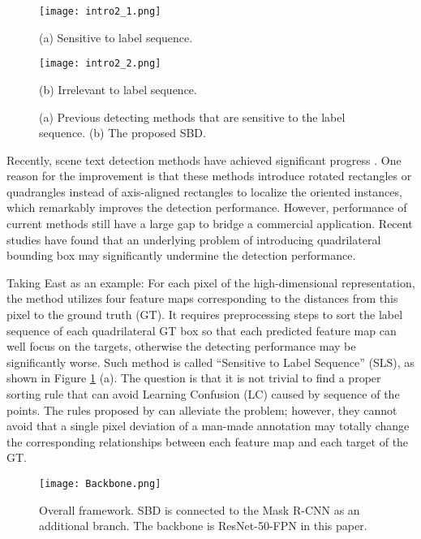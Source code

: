 \documentclass{article}
\begin{document}
\begin{figure}[htb]
\begin{minipage}[c]{0.49\linewidth}
  \centering
  \centerline{\texttt{[image: intro2\_1.png]}}
  \centerline{\small{(a) Sensitive to label sequence. }}\medskip
\end{minipage}
\hfill  
\begin{minipage}[c]{0.49\linewidth}
  \centering
  \centerline{\texttt{[image: intro2\_2.png]}}
  \centerline{\small{(b) Irrelevant to label sequence.  }}\medskip
\end{minipage}

\caption{(a) Previous detecting methods that are sensitive to the label sequence. (b) The proposed SBD.}\label{fig:intro_2}
\end{figure}
 Recently, scene text detection methods have achieved significant progress \cite{zhou2017east,liu2017deep,deng2018pixellink,liao2018textboxes++}. One reason for the improvement is that these methods introduce rotated rectangles or quadrangles instead of axis-aligned rectangles to localize the oriented instances, which remarkably improves the detection performance. However, performance of current methods still have a large gap to bridge a commercial application. Recent studies \cite{liu2017deep,zhu2018sliding} have found that an underlying problem of introducing quadrilateral bounding box may significantly undermine the detection performance.

 Taking East \cite{zhou2017east} as an example: For each pixel of the high-dimensional representation, the method utilizes four feature maps corresponding to the distances from this pixel to the ground truth (GT). It requires preprocessing steps to sort the label sequence of each quadrilateral GT box so that each predicted feature map can well focus on the targets, otherwise the detecting performance may be significantly worse. Such method is called ``Sensitive to Label Sequence'' (SLS), as shown in Figure \ref{fig:intro_2} (a). The question is that it is not trivial to find a proper sorting rule that can avoid Learning Confusion (LC) caused by sequence of the points. The rules proposed by \cite{liu2017deep,liao2018textboxes++,he2018end} can alleviate the problem; however, they cannot avoid that a single pixel deviation of a man-made annotation may totally change the corresponding relationships between each feature map and each target of the GT. 

\begin{figure*}[htb]
  \centering
  \centerline{\texttt{[image: Backbone.png]}}
  \caption{Overall framework. SBD is connected to the Mask R-CNN as an additional branch. The backbone is ResNet-50-FPN in this paper.}\label{fig:overall}
\end{figure*}
\end{document}
